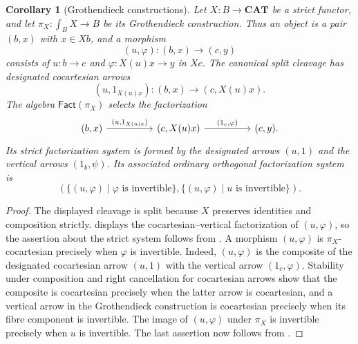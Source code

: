 \documentclass[11pt]{article}
\theoremstyle{plain}
\newtheorem{corollary}[theorem]{Corollary}
\theoremstyle{definition}
\theoremstyle{remark}
\newcommand{\CAT}{\mathbf{CAT}}
\newcommand{\Fact}{\mathsf{Fact}}
\numberwithin{equation}{section}
\begin{document}
\begin{corollary}[Grothendieck constructions]
\label{cor:grothendieck-construction-factorization}
Let $X\colon B\to\CAT$ be a strict functor, and let
$\pi_X\colon\int_BX\to B$ be its Grothendieck construction.  Thus an
object is a pair $(b,x)$ with $x\in Xb$, and a morphism
\begin{equation*}
  (u,\varphi)\colon(b,x)\longrightarrow(c,y)
\end{equation*}
consists of $u\colon b\to c$ and
$\varphi\colon X(u)x\to y$ in $Xc$.  The canonical split cleavage has
designated cocartesian arrows
\begin{equation*}
  (u,1_{X(u)x})\colon(b,x)\longrightarrow(c,X(u)x).
\end{equation*}
The algebra $\Fact(\pi_X)$ selects the factorization
\begin{equation}
\begin{tikzcd}[column sep=huge]
(b,x) \arrow[r,"{(u,1_{X(u)x})}"]
  & (c,X(u)x) \arrow[r,"{(1_c,\varphi)}"]
  & (c,y).
\end{tikzcd}
\label{eq:grothendieck-construction-factorization}
\end{equation}
Its strict factorization system is formed by the designated arrows
$(u,1)$ and the vertical arrows $(1_b,\psi)$.  Its associated ordinary
orthogonal factorization system is
\begin{equation*}
  \left(
    \{(u,\varphi)\mid\varphi\text{ is invertible}\},
    \{(u,\varphi)\mid u\text{ is invertible}\}
  \right).
\end{equation*}
\end{corollary}

\begin{proof}
The displayed cleavage is split because $X$ preserves identities and
composition strictly.  
displays the cocartesian--vertical factorization of $(u,\varphi)$, so the assertion
about the strict system follows from
.
A morphism $(u,\varphi)$ is $\pi_X$-cocartesian precisely when
$\varphi$ is invertible.  Indeed, $(u,\varphi)$ is the composite of the
designated cocartesian arrow $(u,1)$ with the vertical arrow
$(1_c,\varphi)$.  Stability under composition and right cancellation
for cocartesian arrows show that the composite is cocartesian precisely
when the latter arrow is cocartesian, and a vertical arrow in the
Grothendieck construction is cocartesian precisely when its fibre
component is invertible.  The image of $(u,\varphi)$ under $\pi_X$ is
invertible precisely when $u$ is invertible.  The last assertion now
follows from .
\end{proof}
\end{document}
